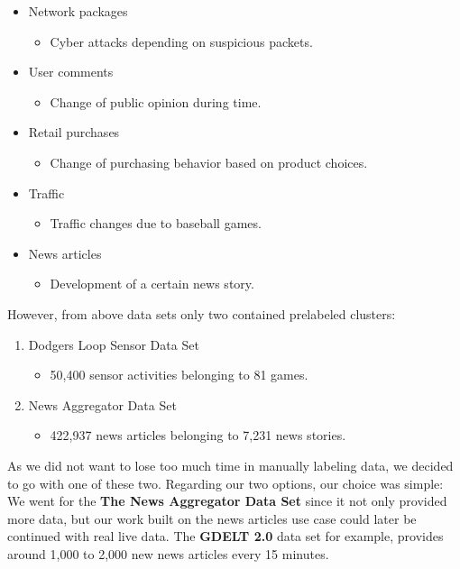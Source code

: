 \begin{itemize}
    \item Network packages
        \begin{itemize}
            \item Cyber attacks depending on suspicious packets.
        \end{itemize}
    \item User comments
        \begin{itemize}
            \item Change of public opinion during time.
        \end{itemize}
    \item Retail purchases
        \begin{itemize}
            \item Change of purchasing behavior based on product choices.
        \end{itemize}
    \item Traffic
        \begin{itemize}
            \item Traffic changes due to baseball games.
        \end{itemize}
    \item News articles
        \begin{itemize}
            \item Development of a certain news story.
        \end{itemize}
\end{itemize}

However, from above data sets only two contained prelabeled clusters:

\begin{enumerate}
    \item Dodgers Loop Sensor Data Set
        \begin{itemize}
            \item 50,400 sensor activities belonging to 81 games.
        \end{itemize}
    \item News Aggregator Data Set
        \begin{itemize}
            \item 422,937 news articles belonging to 7,231 news stories.
        \end{itemize}
\end{enumerate}

As we did not want to lose too much time in manually labeling data, we decided to go with one of these two.
Regarding our two options, our choice was simple:\\
We went for the \textbf{The News Aggregator Data Set} since it not only provided more data,
but our work built on the news articles use case could later be continued with real live data.
The \textbf{GDELT 2.0} data set for example, provides around 1,000 to 2,000 new news articles every 15 minutes.

